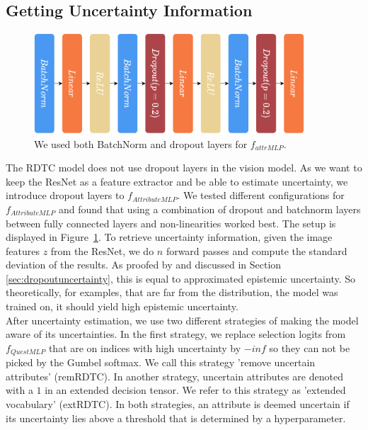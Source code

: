 \documentclass[a4paper,cleardoubleempty,BCOR1cm, 11pt]{report}
\begin{document}
\subsection{Getting Uncertainty Information}
\begin{figure}
	\centering
	\includegraphics[width=0.9\textwidth]{images/f_attrMLP.pdf} 
	\caption{We used both BatchNorm and dropout layers for $f_{attrMLP}$.}
	\label{fig:f_attrMLP}
\end{figure}
The RDTC model does not use dropout layers in the vision model. As we want to keep the ResNet as a feature extractor and be able to estimate uncertainty, we introduce dropout layers to $f_{AttributeMLP}$. We tested different configurations for $f_{AttributeMLP}$ and found that using a combination of dropout and batchnorm layers between fully connected layers and non-linearities worked best. The setup is displayed in Figure~\ref{fig:f_attrMLP}. To retrieve uncertainty information, given the image features $z$ from the ResNet, we do $n$ forward passes and compute the standard deviation of the results. As proofed by \citet{gal2016dropout} and discussed in Section \ref{sec:dropoutuncertainty}, this is equal to approximated epistemic uncertainty. So theoretically, for examples, that are far from the distribution, the model was trained on, it should yield high epistemic uncertainty.\\
After uncertainty estimation, we use two different strategies of making the model aware of its uncertainties. In the first strategy, we replace selection logits from $f_{QuestMLP}$ that are on indices with high uncertainty by $-inf$ so they can not be picked by the Gumbel softmax. We call this strategy 'remove uncertain attributes' (remRDTC). In another strategy, uncertain attributes are denoted with a $1$ in an extended decision tensor. We refer to this strategy as 'extended vocabulary' (extRDTC). In both strategies, an attribute is deemed uncertain if its uncertainty lies above a threshold that is determined by a hyperparameter.
\end{document}
